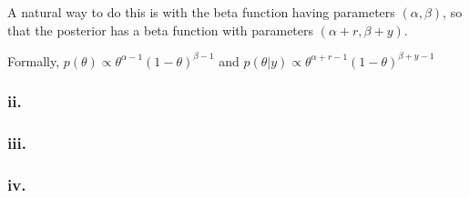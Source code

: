 \documentclass{article}
\begin{document}
A natural way to do this is with the beta function having parameters \((\alpha, \beta)\), so 
that the posterior has a beta function with parameters \((\alpha + r, \beta + y)\).

Formally, \(p(\theta) \propto \theta^{\alpha - 1}(1 - \theta)^{\beta - 1}\) and
\(p(\theta \vert y) \propto \theta^{\alpha + r - 1}(1 - \theta)^{\beta + y - 1}\)

\subsubsection{ii.}
\subsubsection{iii.}
\subsubsection{iv.}
\end{document}
